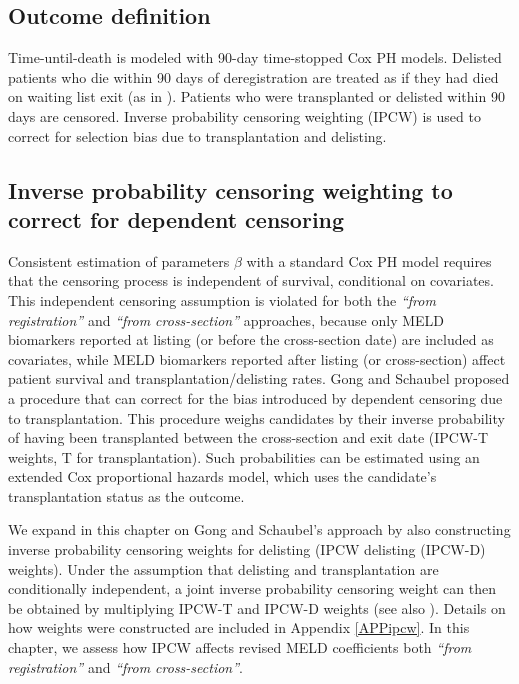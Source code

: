 \documentclass[11pt,twoside,]{book}
\begin{document}
\subsection{Outcome definition}\label{outcome-definition}

Time-until-death is modeled with 90-day time-stopped Cox PH
models. Delisted patients who die within 90 days of deregistration are
treated as if they had died on waiting list exit (as in
\citep{goudsmitRefittingModelEndstage2020}). Patients who were
transplanted or delisted within 90 days are censored.
Inverse probability censoring weighting (IPCW) is used to correct for
selection bias due to transplantation and delisting.

\subsection{Inverse probability censoring weighting to correct for dependent censoring}\label{inverse-probability-censoring-weighting-to-correct-for-dependent-censoring}

Consistent estimation of parameters \(\beta\) with a standard Cox PH model
requires that the censoring process is independent of survival,
conditional on covariates. This independent censoring
assumption is violated for both the \emph{``from registration''} and \emph{``from
cross-section''} approaches, because only MELD biomarkers
reported at listing (or before the cross-section date) are included as covariates, while MELD biomarkers
reported after listing (or cross-section) affect patient survival and transplantation/delisting rates.
Gong and Schaubel proposed a procedure
that can correct for the bias introduced by dependent censoring due to transplantation.
This procedure weighs candidates by their inverse probability of having been transplanted
between the cross-section and exit date (IPCW-T weights, T for transplantation).
Such probabilities can be estimated using an extended Cox proportional hazards model, which
uses the candidate's transplantation status as the outcome.

We expand in this chapter on Gong and Schaubel's approach by also
constructing inverse probability censoring weights for delisting
(IPCW delisting (IPCW-D) weights). Under the assumption that delisting
and transplantation are conditionally independent, a joint inverse
probability censoring weight can then be obtained by multiplying
IPCW-T and IPCW-D weights (see also \citep{schnellingerMitigatingSelectionBias2021}). Details on how weights
were constructed are included in Appendix \ref{APPipcw}. In this chapter, we assess
how IPCW affects revised MELD coefficients both \emph{``from registration''}
and \emph{``from cross-section''}.
\end{document}
